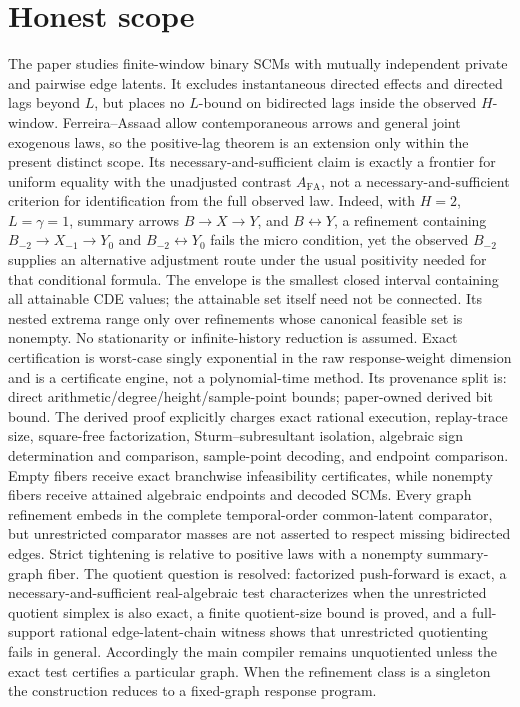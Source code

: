 \documentclass{article}
\begin{document}
\section{Honest scope}

The paper studies finite-window binary SCMs with mutually independent private and pairwise edge latents. It excludes instantaneous directed effects and directed lags beyond \(L\), but places no \(L\)-bound on bidirected lags inside the observed \(H\)-window. Ferreira--Assaad allow contemporaneous arrows and general joint exogenous laws, so the positive-lag theorem is an extension only within the present distinct scope. Its necessary-and-sufficient claim is exactly a frontier for uniform equality with the unadjusted contrast \(A_{\mathrm{FA}}\), not a necessary-and-sufficient criterion for identification from the full observed law. Indeed, with \(H=2\), \(L=\gamma=1\), summary arrows \(B\to X\to Y\), and \(B\leftrightarrow Y\), a refinement containing \(B_{-2}\to X_{-1}\to Y_0\) and \(B_{-2}\leftrightarrow Y_0\) fails the micro condition, yet the observed \(B_{-2}\) supplies an alternative adjustment route under the usual positivity needed for that conditional formula. The envelope is the smallest closed interval containing all attainable CDE values; the attainable set itself need not be connected. Its nested extrema range only over refinements whose canonical feasible set is nonempty. No stationarity or infinite-history reduction is assumed. Exact certification is worst-case singly exponential in the raw response-weight dimension and is a certificate engine, not a polynomial-time method. Its provenance split is: direct arithmetic/degree/height/sample-point bounds; paper-owned derived bit bound. The derived proof explicitly charges exact rational execution, replay-trace size, square-free factorization, Sturm--subresultant isolation, algebraic sign determination and comparison, sample-point decoding, and endpoint comparison. Empty fibers receive exact branchwise infeasibility certificates, while nonempty fibers receive attained algebraic endpoints and decoded SCMs. Every graph refinement embeds in the complete temporal-order common-latent comparator, but unrestricted comparator masses are not asserted to respect missing bidirected edges. Strict tightening is relative to positive laws with a nonempty summary-graph fiber. The quotient question is resolved: factorized push-forward is exact, a necessary-and-sufficient real-algebraic test characterizes when the unrestricted quotient simplex is also exact, a finite quotient-size bound is proved, and a full-support rational edge-latent-chain witness shows that unrestricted quotienting fails in general. Accordingly the main compiler remains unquotiented unless the exact test certifies a particular graph. When the refinement class is a singleton the construction reduces to a fixed-graph response program.
\end{document}
